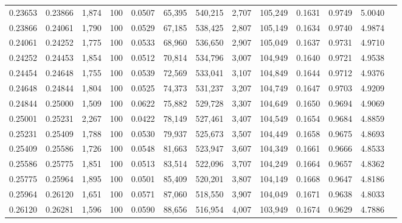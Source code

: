 \begin{tabular}{rrrrrrrrrrrrr}
0.23653 & 0.23866 & 1,874 & 100 &                                     0.0507 &  65,395 & 540,215 &   2,707 & 105,249 & 0.1631 & 0.9749 & 5.0040 \\
0.23866 & 0.24061 & 1,790 & 100 &                                     0.0529 &  67,185 & 538,425 &   2,807 & 105,149 & 0.1634 & 0.9740 & 4.9874 \\
0.24061 & 0.24252 & 1,775 & 100 &                                     0.0533 &  68,960 & 536,650 &   2,907 & 105,049 & 0.1637 & 0.9731 & 4.9710 \\
0.24252 & 0.24453 & 1,854 & 100 &                                     0.0512 &  70,814 & 534,796 &   3,007 & 104,949 & 0.1640 & 0.9721 & 4.9538 \\
0.24454 & 0.24648 & 1,755 & 100 &                                     0.0539 &  72,569 & 533,041 &   3,107 & 104,849 & 0.1644 & 0.9712 & 4.9376 \\
0.24648 & 0.24844 & 1,804 & 100 &                                     0.0525 &  74,373 & 531,237 &   3,207 & 104,749 & 0.1647 & 0.9703 & 4.9209 \\
0.24844 & 0.25000 & 1,509 & 100 &                                     0.0622 &  75,882 & 529,728 &   3,307 & 104,649 & 0.1650 & 0.9694 & 4.9069 \\
0.25001 & 0.25231 & 2,267 & 100 &                                     0.0422 &  78,149 & 527,461 &   3,407 & 104,549 & 0.1654 & 0.9684 & 4.8859 \\
0.25231 & 0.25409 & 1,788 & 100 &                                     0.0530 &  79,937 & 525,673 &   3,507 & 104,449 & 0.1658 & 0.9675 & 4.8693 \\
0.25409 & 0.25586 & 1,726 & 100 &                                     0.0548 &  81,663 & 523,947 &   3,607 & 104,349 & 0.1661 & 0.9666 & 4.8533 \\
0.25586 & 0.25775 & 1,851 & 100 &                                     0.0513 &  83,514 & 522,096 &   3,707 & 104,249 & 0.1664 & 0.9657 & 4.8362 \\
0.25775 & 0.25964 & 1,895 & 100 &                                     0.0501 &  85,409 & 520,201 &   3,807 & 104,149 & 0.1668 & 0.9647 & 4.8186 \\
0.25964 & 0.26120 & 1,651 & 100 &                                     0.0571 &  87,060 & 518,550 &   3,907 & 104,049 & 0.1671 & 0.9638 & 4.8033 \\
0.26120 & 0.26281 & 1,596 & 100 &                                     0.0590 &  88,656 & 516,954 &   4,007 & 103,949 & 0.1674 & 0.9629 & 4.7886 \\

\end{tabular}
